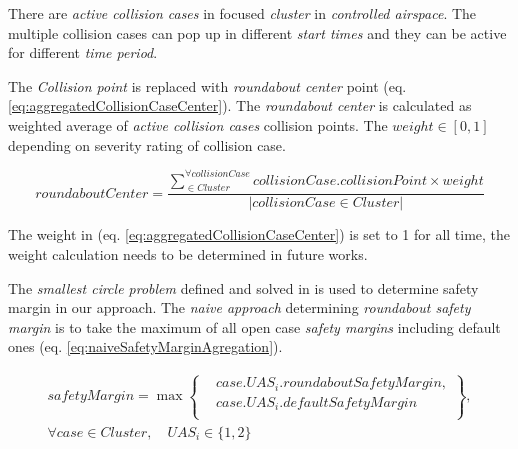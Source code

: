 There are \emph{active collision cases} in focused \emph{cluster} in \emph{controlled airspace}. The multiple collision cases can pop up in different \emph{start times} and they can be active for different \emph{time period}. 

The \emph{Collision point} is replaced with \emph{roundabout center} point (eq. \ref{eq:aggregatedCollisionCaseCenter}). The \emph{roundabout center} is calculated as weighted average of \emph{active collision cases} collision points. The $weight \in [0,1]$ depending on severity rating of collision case.

\begin{equation}\label{eq:aggregatedCollisionCaseCenter}
    roundaboutCenter=\frac{\sum_{ \in Cluster}^{\forall collisionCase} collisionCase.collisionPoint \times weight}{\left | collisionCase \in Cluster \right |}
\end{equation}

\begin{note}
    The weight in (eq. \ref{eq:aggregatedCollisionCaseCenter}) is set to 1 for all time, the weight calculation needs to be determined in future works. 
\end{note}

The \emph{smallest circle problem} defined and solved in \cite{ritter1990efficient,welzl1991smallest} is used to determine safety margin in our approach. The \emph{naive approach} determining \emph{roundabout safety margin} is to take the maximum of all open case \emph{safety margins} including default ones (eq. \ref{eq:naiveSafetyMarginAgregation}).

\begin{multline}\label{eq:naiveSafetyMarginAgregation}
    safetyMargin = \max \left\{\begin{aligned}&case.UAS_i.roundabout Safety Margin,\\&case.UAS_i.default Safety Margin\\\end{aligned}\right \},\\
    \forall case \in Cluster,\quad UAS_i \in \{1,2\}
\end{multline}


